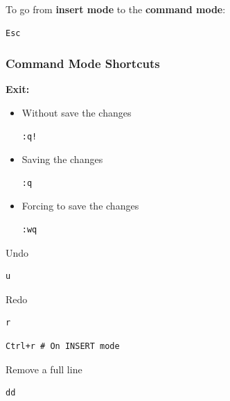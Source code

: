 \documentclass{article}
\newenvironment{codetemplate}[1][]{%
  \mybasecolorbox[#1]
  \itshape
}{%
  \endmybasecolorbox
}
\begin{document}
To go from \textbf{insert mode} to the \textbf{command mode}:
\begin{codetemplate}{}
\begin{verbatim}
Esc
\end{verbatim}
\end{codetemplate}

\subsubsection{Command Mode Shortcuts}

\textbf{Exit:}

\begin{itemize}
    \item Without save the changes
\begin{codetemplate}{}
\begin{verbatim}
:q!
\end{verbatim}
\end{codetemplate}
    \item Saving the changes
\begin{codetemplate}{}
\begin{verbatim}
:q
\end{verbatim}
\end{codetemplate}

    \item Forcing to save the changes
\begin{codetemplate}{}
\begin{verbatim}
:wq
\end{verbatim}
\end{codetemplate}
\end{itemize}


Undo
\begin{codetemplate}{}
\begin{verbatim}
u
\end{verbatim}
\end{codetemplate}

Redo
\begin{codetemplate}{}
\begin{verbatim}
r
\end{verbatim}
\end{codetemplate}
\begin{codetemplate}{}
\begin{verbatim}
Ctrl+r # On INSERT mode
\end{verbatim}
\end{codetemplate}

Remove a full line
\begin{codetemplate}{}
\begin{verbatim}
dd
\end{verbatim}
\end{codetemplate}
\end{document}
